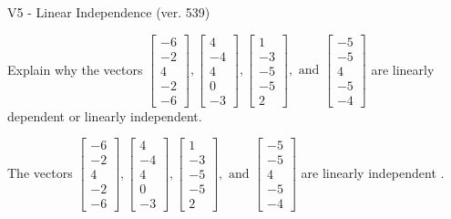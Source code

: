 \begin{exercise}
  \begin{exerciseTitle}V5 - Linear Independence (ver. 539)\end{exerciseTitle}
  \begin{exerciseStatement}
    Explain why the vectors \(\left[\begin{array}{r}
-6 \\
-2 \\
4 \\
-2 \\
-6
\end{array}\right] , \left[\begin{array}{r}
4 \\
-4 \\
4 \\
0 \\
-3
\end{array}\right] , \left[\begin{array}{r}
1 \\
-3 \\
-5 \\
-5 \\
2
\end{array}\right] , \text{ and } \left[\begin{array}{r}
-5 \\
-5 \\
4 \\
-5 \\
-4
\end{array}\right]\) are linearly dependent or linearly independent.	


  \end{exerciseStatement}
  \begin{exerciseAnswer}
   The vectors \(\left[\begin{array}{r}
-6 \\
-2 \\
4 \\
-2 \\
-6
\end{array}\right] , \left[\begin{array}{r}
4 \\
-4 \\
4 \\
0 \\
-3
\end{array}\right] , \left[\begin{array}{r}
1 \\
-3 \\
-5 \\
-5 \\
2
\end{array}\right] , \text{ and } \left[\begin{array}{r}
-5 \\
-5 \\
4 \\
-5 \\
-4
\end{array}\right]\) are 
  	 linearly independent  .
  


  \end{exerciseAnswer}
\end{exercise}